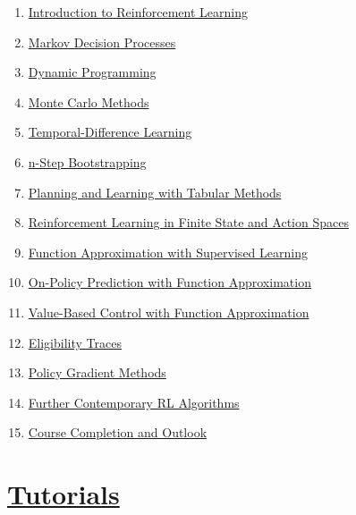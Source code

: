 \documentclass[11pt]{article}
\begin{document}
\begin{enumerate}
	\item  \href{https://mp.weixin.qq.com/s/wbjVcTLvAXxvD9tpQj1gGg}{Introduction to Reinforcement Learning} %
	\item  \href{https://mp.weixin.qq.com/s/1sytOReDyGq6rxM1haxN3g}{Markov Decision Processes} %
	\item  \href{https://mp.weixin.qq.com/s/SSjSL8i990Q6sohGCZMBew}{Dynamic Programming} %
	\item  \href{https://mp.weixin.qq.com/s/2Yy4Kndto97x60XVigVhqA}{Monte Carlo Methods} %
	\item  \href{https://mp.weixin.qq.com/s/lbWzISUof9JVx3A5RSaXZQ}{Temporal-Difference Learning} %
	\item  \href{https://mp.weixin.qq.com/s/ZVbUvJq-S2ZiJ4BgBQZgXw}{n-Step Bootstrapping} %
	\item  \href{https://mp.weixin.qq.com/s/BjefQRDak19vIuhFMIPs8g}{Planning and Learning with Tabular Methods} %
	\item  \href{https://mp.weixin.qq.com/s/vQkOAS3Dx22xj1rcDcR9uQ}{Reinforcement Learning in Finite State and Action Spaces} %
	\item  \href{https://mp.weixin.qq.com/s/c1ph8uO17kXTYfu8hHGrmA}{Function Approximation with Supervised Learning} %
	\item  \href{https://mp.weixin.qq.com/s/lSQShYzxn9fVH54ebnqHLQ}{On-Policy Prediction with Function Approximation} %
	\item  \href{https://mp.weixin.qq.com/s/A3MGjiVIbTDcZX1zbQhHZg}{Value-Based Control with Function Approximation} %
	\item  \href{https://mp.weixin.qq.com/s/a7KmoyhL3mctpDucdApiWQ}{Eligibility Traces} %
	\item  \href{https://mp.weixin.qq.com/s/8FkfFUQE_QmzTZAOOFKbiw}{Policy Gradient Methods} %
	\item  \href{https://mp.weixin.qq.com/s/UYPhyuwv1GbEHRxkWGVpng}{Further Contemporary RL Algorithms} %
	\item  \href{https://mp.weixin.qq.com/s/3mepjTPMv-90QDjj-gQYnQ}{Course Completion and Outlook} %
\end{enumerate}

\vspace{-1cm}

\section{\href{https://www.youtube.com/playlist?list=PL4GzQQuIDBGtzU2oaDIGhDaVBwuAs8Od5}{Tutorials}}
\end{document}
